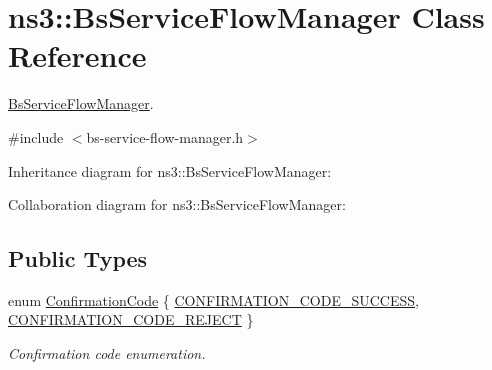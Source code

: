 \hypertarget{classns3_1_1BsServiceFlowManager}{}\section{ns3\+:\+:Bs\+Service\+Flow\+Manager Class Reference}
\label{classns3_1_1BsServiceFlowManager}


\hyperlink{classns3_1_1BsServiceFlowManager}{Bs\+Service\+Flow\+Manager}.  




{\ttfamily \#include $<$bs-\/service-\/flow-\/manager.\+h$>$}



Inheritance diagram for ns3\+:\+:Bs\+Service\+Flow\+Manager\+:


Collaboration diagram for ns3\+:\+:Bs\+Service\+Flow\+Manager\+:
\subsection*{Public Types}
\begin{DoxyCompactItemize}
\item 
enum \hyperlink{classns3_1_1BsServiceFlowManager_a7caa3307401b19d092e9dd656d5aa523}{Confirmation\+Code} \{ \hyperlink{classns3_1_1BsServiceFlowManager_a7caa3307401b19d092e9dd656d5aa523a0cd742fb80a8828c02e66f504c35df8c}{C\+O\+N\+F\+I\+R\+M\+A\+T\+I\+O\+N\+\_\+\+C\+O\+D\+E\+\_\+\+S\+U\+C\+C\+E\+SS}, 
\hyperlink{classns3_1_1BsServiceFlowManager_a7caa3307401b19d092e9dd656d5aa523adc4b9508982fb872a4829b0b9d7fa1fa}{C\+O\+N\+F\+I\+R\+M\+A\+T\+I\+O\+N\+\_\+\+C\+O\+D\+E\+\_\+\+R\+E\+J\+E\+CT}
 \}\begin{DoxyCompactList}\small\item\em Confirmation code enumeration. \end{DoxyCompactList}
\end{DoxyCompactItemize}
